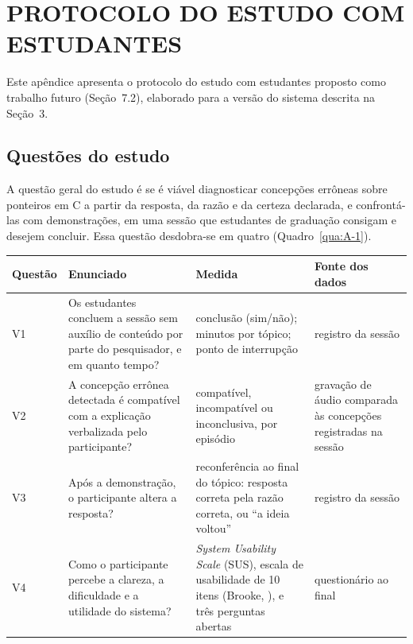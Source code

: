 
\chapter{\texorpdfstring{\mbox{PROTOCOLO} \mbox{DO} \mbox{ESTUDO} \mbox{COM} \mbox{ESTUDANTES}}{PROTOCOLO DO ESTUDO COM ESTUDANTES}}\label{cap:A}

Este apêndice apresenta o protocolo do estudo com estudantes proposto como trabalho futuro (Seção~7.2), elaborado para a versão do sistema descrita na Seção~3.

\section{Questões do estudo}

A questão geral do estudo é se é viável diagnosticar concepções errôneas sobre ponteiros em C a partir da resposta, da razão e da certeza declarada, e confrontá-las com demonstrações, em uma sessão que estudantes de graduação consigam e desejem concluir. Essa questão desdobra-se em quatro (Quadro~\ref{qua:A-1}).

\begin{quadro}[htbp]
\caption{Questões do estudo}\label{qua:A-1}
\footnotesize
\begin{tabularx}{\textwidth}{|>{\centering\arraybackslash}p{1.9cm}|X|X|X|}
\hline
\textbf{Questão} & \textbf{Enunciado} & \textbf{Medida} & \textbf{Fonte dos dados} \\ \hline
V1 & Os estudantes concluem a sessão sem auxílio de conteúdo por parte do pesquisador, e em quanto tempo? & conclusão (sim/não); minutos por tópico; ponto de interrupção & registro da sessão \\ \hline
V2 & A concepção errônea detectada é compatível com a explicação verbalizada pelo participante? & compatível, incompatível ou inconclusiva, por episódio & gravação de áudio comparada às concepções registradas na sessão \\ \hline
V3 & Após a demonstração, o participante altera a resposta? & reconferência ao final do tópico: resposta correta pela razão correta, ou ``a ideia voltou'' & registro da sessão \\ \hline
V4 & Como o participante percebe a clareza, a dificuldade e a utilidade do sistema? & \textit{System Usability Scale} (SUS), escala de usabilidade de 10 itens (Brooke, \citeyear{brooke1996}), e três perguntas abertas & questionário ao final \\ \hline
\end{tabularx}
\end{quadro}

